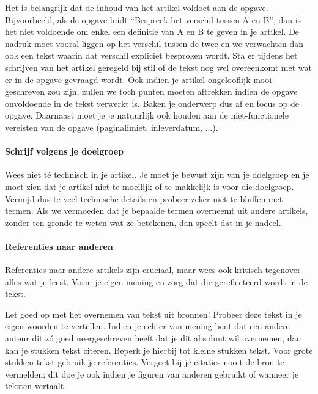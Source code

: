\documentclass[a4paper]{article}
\begin{document}
Het is belangrijk dat de inhoud van het artikel voldoet aan de opgave.
Bijvoorbeeld, als de opgave luidt ``Bespreek het verschil tussen A en B'', dan is het niet voldoende om enkel een definitie van A en B te geven in je artikel.
De nadruk moet vooral liggen op het verschil tussen de twee en we verwachten dan ook een tekst waarin dat verschil expliciet besproken wordt.
Sta er tijdens het schrijven van het artikel geregeld bij stil of de tekst nog wel overeenkomt met wat er in de opgave gevraagd wordt.
Ook indien je artikel ongelooflijk mooi geschreven zou zijn, zullen we toch punten moeten aftrekken indien de opgave onvoldoende in de tekst verwerkt is.
Baken je onderwerp dus af en focus op de opgave.
Daarnaast moet je je natuurlijk ook houden aan de niet-functionele vereisten van de opgave (paginalimiet, inleverdatum, ...).


\paragraph{Schrijf volgens je doelgroep}

Wees niet t\'e technisch in je artikel.
Je moet je bewust zijn van je doelgroep en je moet zien dat je artikel niet te moeilijk of te makkelijk is voor die doelgroep.
Vermijd dus te veel technische details en probeer zeker niet te bluffen met termen.
Als we vermoeden dat je bepaalde termen overneemt uit andere artikels, zonder ten gronde te weten wat ze betekenen, dan speelt dat in je nadeel.


\paragraph{Referenties naar anderen}

Referenties naar andere artikels zijn cruciaal, maar wees ook kritisch tegenover alles wat je leest.
Vorm je eigen mening en zorg dat die gereflecteerd wordt in de tekst.

Let goed op met het overnemen van tekst uit bronnen!
Probeer deze tekst in je eigen woorden te vertellen.
Indien je echter van mening bent dat een andere auteur dit z\'o goed neergeschreven heeft dat je dit absoluut wil overnemen, dan kan je stukken tekst citeren.
Beperk je hierbij tot kleine stukken tekst.
Voor grote stukken tekst gebruik je referenties.
Vergeet bij je citaties nooit de bron te vermelden; dit doe je ook indien je figuren van anderen gebruikt of wanneer je teksten vertaalt.



\end{document}
